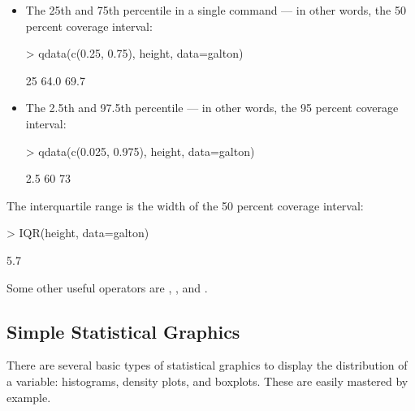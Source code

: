 \begin{itemize}
\item The 25th and 75th percentile in a single command --- in other
  words, the 50 percent coverage interval:
\begin{Schunk}
\begin{Sinput}
> qdata(c(0.25, 0.75), height, data=galton)
\end{Sinput}
\begin{Soutput}
 25%
64.0 69.7 
\end{Soutput}
\end{Schunk}

\item The 2.5th and 97.5th percentile --- in other words, the 95
  percent coverage interval:
\begin{Schunk}
\begin{Sinput}
> qdata(c(0.025, 0.975), height, data=galton)
\end{Sinput}
\begin{Soutput}
 2.5%
   60    73 
\end{Soutput}
\end{Schunk}
\end{itemize}

The interquartile range is the width of the 50 percent coverage
interval:
\begin{Schunk}
\begin{Sinput}
> IQR(height, data=galton)
\end{Sinput}
\begin{Soutput}
[1] 5.7
\end{Soutput}
\end{Schunk}

Some other useful operators are , , and
.  



\subsection{Simple Statistical Graphics}

There are several basic types of statistical graphics to display
the distribution of a variable: histograms, density plots, and
boxplots.  These are easily mastered by example. 

